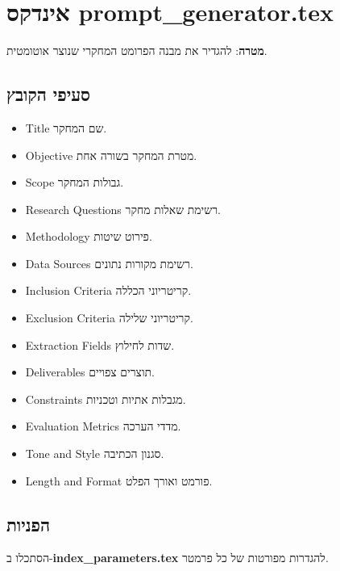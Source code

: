 \documentclass[12pt]{article}
\begin{document}
\section*{אינדקס prompt\_generator.tex}
\textbf{מטרה}:
להגדיר את מבנה הפרומט המחקרי שנוצר אוטומטית.

\subsection*{סעיפי הקובץ}
\begin{itemize}
  \item Title שם המחקר.
  \item Objective מטרת המחקר בשורה אחת.
  \item Scope גבולות המחקר.
  \item Research Questions רשימת שאלות מחקר.
  \item Methodology פירוט שיטות.
  \item Data Sources רשימת מקורות נתונים.
  \item Inclusion Criteria קריטריוני הכללה.
  \item Exclusion Criteria קריטריוני שלילה.
  \item Extraction Fields שדות לחילוץ.
  \item Deliverables תוצרים צפויים.
  \item Constraints מגבלות אתיות וטכניות.
  \item Evaluation Metrics מדדי הערכה.
  \item Tone and Style סגנון הכתיבה.
  \item Length and Format פורמט ואורך הפלט.
\end{itemize}

\subsection*{הפניות}
הסתכלו ב-\textbf{index\_parameters.tex} להגדרות מפורטות של כל פרמטר.
\end{document}
